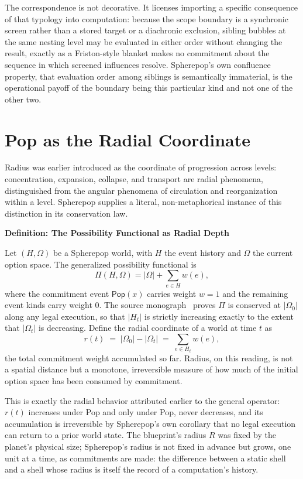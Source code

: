 \documentclass[11pt,fleqn]{book}
\numberwithin{equation}{chapter}
\newenvironment{definition}[1]
  {\begin{definitionEnv}
   \noindent\textbf{Definition: #1}\par\smallskip}
  {\end{definitionEnv}}
\theoremstyle{plain}
\theoremstyle{definition}
\theoremstyle{remark}
\providecommand{\Pop}{\mathsf{Pop}}
\begin{document}
The correspondence is not decorative. It licenses importing a specific consequence of that typology into computation: because the scope boundary is a synchronic screen rather than a stored target or a diachronic exclusion, sibling bubbles at the same nesting level may be evaluated in either order without changing the result, exactly as a Friston-style blanket makes no commitment about the sequence in which screened influences resolve. Spherepop's own confluence property, that evaluation order among siblings is semantically immaterial, is the operational payoff of the boundary being this particular kind and not one of the other two.

\section{Pop as the Radial Coordinate}

Radius was earlier introduced as the coordinate of progression across levels: concentration, expansion, collapse, and transport are radial phenomena, distinguished from the angular phenomena of circulation and reorganization within a level. Spherepop supplies a literal, non-metaphorical instance of this distinction in its conservation law.

\begin{definition}{The Possibility Functional as Radial Depth}
Let \((H,\Omega)\) be a Spherepop world, with \(H\) the event history and \(\Omega\) the current option space. The generalized possibility functional is
\[
\Pi(H,\Omega) = |\Omega| + \sum_{e\in H} w(e),
\]
where the commitment event \(\Pop(x)\) carries weight \(w=1\) and the remaining event kinds carry weight \(0\). The source monograph~\cite{spherepop-histories} proves \(\Pi\) is conserved at \(|\Omega_0|\) along any legal execution, so that \(|H_t|\) is strictly increasing exactly to the extent that \(|\Omega_t|\) is decreasing. Define the radial coordinate of a world at time \(t\) as
\[
r(t) \;=\; |\Omega_0| - |\Omega_t| \;=\; \sum_{e\in H_t} w(e),
\]
the total commitment weight accumulated so far. Radius, on this reading, is not a spatial distance but a monotone, irreversible measure of how much of the initial option space has been consumed by commitment.
\end{definition}

This is exactly the radial behavior attributed earlier to the general operator: \(r(t)\) increases under Pop and only under Pop, never decreases, and its accumulation is irreversible by Spherepop's own corollary that no legal execution can return to a prior world state. The blueprint's radius \(R\) was fixed by the planet's physical size; Spherepop's radius is not fixed in advance but grows, one unit at a time, as commitments are made: the difference between a static shell and a shell whose radius is itself the record of a computation's history.
\end{document}
